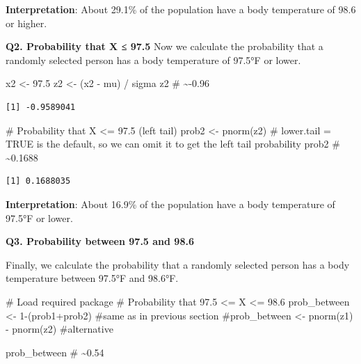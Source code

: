 \documentclass[
  letterpaper,
  DIV=11,
  numbers=noendperiod]{scrreprt}
\newenvironment{Shaded}{\begin{snugshade}}{\end{snugshade}}
\newcommand{\CommentTok}[1]{\textcolor[rgb]{0.37,0.37,0.37}{#1}}
\newcommand{\DecValTok}[1]{\textcolor[rgb]{0.68,0.00,0.00}{#1}}
\newcommand{\FloatTok}[1]{\textcolor[rgb]{0.68,0.00,0.00}{#1}}
\newcommand{\FunctionTok}[1]{\textcolor[rgb]{0.28,0.35,0.67}{#1}}
\newcommand{\NormalTok}[1]{\textcolor[rgb]{0.00,0.23,0.31}{#1}}
\newcommand{\OtherTok}[1]{\textcolor[rgb]{0.00,0.23,0.31}{#1}}
\newcommand{\SpecialCharTok}[1]{\textcolor[rgb]{0.37,0.37,0.37}{#1}}
\begin{document}
\textbf{Interpretation}: About 29.1\% of the population have a body
temperature of 98.6 or higher.

\textbf{Q2. Probability that X ≤ 97.5} Now we calculate the probability
that a randomly selected person has a body temperature of 97.5°F or
lower.

\begin{Shaded}
\begin{Highlighting}[]
\NormalTok{x2 }\OtherTok{\textless{}{-}} \FloatTok{97.5} 
\NormalTok{z2 }\OtherTok{\textless{}{-}}\NormalTok{ (x2 }\SpecialCharTok{{-}}\NormalTok{ mu) }\SpecialCharTok{/}\NormalTok{ sigma }
\NormalTok{z2 }\CommentTok{\# \textasciitilde{}{-}0.96 }
\end{Highlighting}
\end{Shaded}

\begin{verbatim}
[1] -0.9589041
\end{verbatim}

\begin{Shaded}
\begin{Highlighting}[]
\CommentTok{\# Probability that X \textless{}= 97.5 (left tail) }
\NormalTok{prob2 }\OtherTok{\textless{}{-}} \FunctionTok{pnorm}\NormalTok{(z2) }\CommentTok{\# lower.tail = TRUE is the default, so we can omit it to get the left tail probability }
\NormalTok{prob2   }\CommentTok{\# \textasciitilde{}0.1688 }
\end{Highlighting}
\end{Shaded}

\begin{verbatim}
[1] 0.1688035
\end{verbatim}

\textbf{Interpretation}: About 16.9\% of the population have a body
temperature of 97.5°F or lower.

\textbf{Q3. Probability between 97.5 and 98.6}

Finally, we calculate the probability that a randomly selected person
has a body temperature between 97.5°F and 98.6°F.

\begin{Shaded}
\begin{Highlighting}[]
\CommentTok{\# Load required package }
\CommentTok{\# Probability that 97.5 \textless{}= X \textless{}= 98.6 }
\NormalTok{prob\_between }\OtherTok{\textless{}{-}} \DecValTok{1}\SpecialCharTok{{-}}\NormalTok{(prob1}\SpecialCharTok{+}\NormalTok{prob2) }\CommentTok{\#same as in previous section }
\CommentTok{\#prob\_between \textless{}{-} pnorm(z1) {-} pnorm(z2) \#alternative }
 
\NormalTok{prob\_between  }\CommentTok{\# \textasciitilde{}0.54 }
\end{Highlighting}
\end{Shaded}
\end{document}

